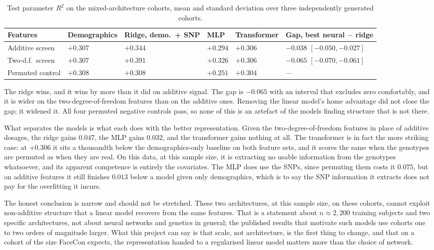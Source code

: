 \begin{table}[!ht]
\centering
\caption{Test parameter $R^2$ on the mixed-architecture cohorts, mean and standard deviation over three independently generated cohorts.}
\label{tab:res-nonadd-neural}
\small{}
\begin{tabular}{|P{2.6cm}|P{2.35cm}|P{2.2cm}|P{1.3cm}|P{2.0cm}|P{2.6cm}|}
\hline
\textbf{Features} & \textbf{Demographics} & \textbf{Ridge, demo.\ + SNP} & \textbf{MLP} & \textbf{Transformer} & \textbf{Gap, best neural $-$ ridge} \\ \hline
Additive screen & $+0.307$ & $+0.344$ & $+0.294$ & $+0.306$ & $-0.038$ $[-0.050,-0.027]$ \\ \hline
Two-d.f.\ screen & $+0.307$ & $+0.391$ & $+0.326$ & $+0.306$ & $-0.065$ $[-0.070,-0.061]$ \\ \hline
Permuted control & $+0.308$ & $+0.308$ & $+0.251$ & $+0.304$ & --- \\ \hline
\end{tabular}
\end{table}

The ridge wins, and it wins by more than it did on additive signal. The gap is $-0.065$ with an interval that excludes zero comfortably, and it is wider on the two-degree-of-freedom features than on the additive ones. Removing the linear model's home advantage did not close the gap; it widened it. All four permuted negative controls pass, so none of this is an artefact of the models finding structure that is not there.

What separates the models is what each does with the better representation. Given the two-degree-of-freedom features in place of additive dosages, the ridge gains $0.047$, the MLP gains $0.032$, and the transformer gains nothing at all. The transformer is in fact the more striking case: at $+0.306$ it sits a thousandth below the demographics-only baseline on both feature sets, and it scores the same when the genotypes are permuted as when they are real. On this data, at this sample size, it is extracting no usable information from the genotypes whatsoever, and its apparent competence is entirely the covariates. The MLP does use the SNPs, since permuting them costs it $0.075$, but on additive features it still finishes $0.013$ below a model given only demographics, which is to say the SNP information it extracts does not pay for the overfitting it incurs.

The honest conclusion is narrow and should not be stretched. These two architectures, at this sample size, on these cohorts, cannot exploit non-additive structure that a linear model recovers from the same features. That is a statement about $n \approx 2{,}200$ training subjects and two specific architectures, not about neural networks and genetics in general; the published results that motivate such models use cohorts one to two orders of magnitude larger. What this project can say is that scale, not architecture, is the first thing to change, and that on a cohort of the size FaceCon expects, the representation handed to a regularised linear model matters more than the choice of network.

